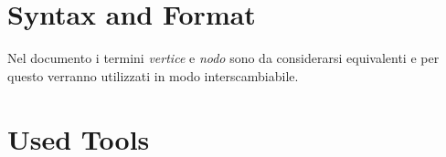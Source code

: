 
\section*{Syntax and Format}

Nel documento i termini \emph{vertice} e \emph{nodo} sono da
considerarsi equivalenti e per questo verranno utilizzati in modo
interscambiabile.

\section*{Used Tools}
